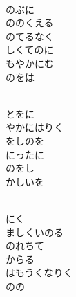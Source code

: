 \documentclass[10pt,b5j]{tarticle} %
\begin{document}
\vspace{1.5em} %
\newcommand{\linespace}{0.5em} %
\newcommand{\blocksize}{0.5\hsize} %
\newcommand{\itemmargin}{6em} %
\begin{enumerate} %
    \setlength{\itemindent}{\itemmargin} %
    \begin{minipage}[c]{\blocksize}
    
        \vspace{\linespace}
        \item~\\
        のぶに\\
        ののくえる\\
        のてるなく\\
        しくてのに\\
        もやかにむ\\
        のをは
        
        \vspace{\linespace}
        \item~\\
        とをに\\
        やかにはりく\\
        をしのを\\
        にったに\\
        のをし\\
        かしいを
        
        \vspace{\linespace}
        \item~\\
        にく\\
        ましくいのる\\
        のれちて\\
        からる\\
        はもうくなりく\\
        のの
        

\end{minipage}
\end{enumerate}
\end{document}
